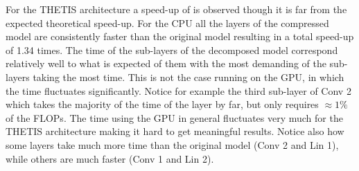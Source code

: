 For the THETIS architecture a speed-up of is observed though it is far from the expected theoretical speed-up. For the CPU all the layers of the compressed model are consistently faster than the original model resulting in a total speed-up of 1.34 times. The time of the sub-layers of the decomposed model correspond relatively well to what is expected of them with the most demanding of the sub-layers taking the most time. This is not the case running on the GPU, in which the time fluctuates significantly. Notice for example the third sub-layer of Conv 2 which takes the majority of the time of the layer by far, but only requires $\approx 1\%$ of the FLOPs. The time using the GPU in general fluctuates very much for the THETIS architecture making it hard to get meaningful results. Notice also how some layers take much more time than the original model (Conv 2 and Lin 1), while others are much faster (Conv 1 and Lin 2).

